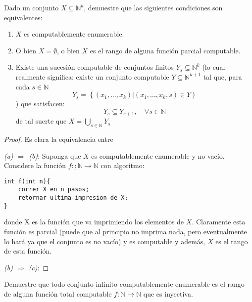 \documentclass[12pt]{report}
\newcounter{it}
\theoremstyle{largebreak}
\newcommand\cf[3]{\ensuremath{#1:#2\rightarrow#3}}
\begin{document}
    \begin{excer}
        Dado un conjunto $X\subseteq\mathbb{N}^k$, demuestre que las siguientes condiciones son equivalentes:
        \begin{enumerate}[label = \textit{(\alph*)}]
            \item $X$ es computablemente enumerable.
            \item O bien $X=\emptyset$, o bien $X$ es el rango de alguna función parcial computable.
            \item Existe una sucesión computable de conjuntos finitos $Y_s\subseteq\mathbb{N}^k$ (lo cual realmente significa: existe un conjunto computable $Y\subseteq\mathbb{N}^{ k+1}$ tal que, para cada $s\in\mathbb{N}$
            \begin{equation*}
                Y_s=\left\{(x_1,...,x_k)\Big|(x_1,...,x_k,s)\in Y \right\}
            \end{equation*}
            ) que satisfacen:
            \begin{equation*}
                Y_s\subseteq Y_{ s+1},\quad\forall s\in\mathbb{N}
            \end{equation*}
            de tal suerte que $X=\bigcup_{ s\in\mathbb{N}}Y_s$
        \end{enumerate}
    \end{excer}

    \begin{proof}
        Es clara la equivalencia entre 

        \textit{(a) $\Rightarrow$ (b)}: Suponga que $X$ es computablemente enumerable y no vacío. Considere la función $\cf{f}{;\mathbb{N}}{\mathbb{N}}$ con algoritmo:
        \begin{lstlisting}
int f(int n){
    correr X en n pasos;
    retornar ultima impresion de X;
}
        \end{lstlisting}
        donde {\selectfont X} es la función que va imprimiendo los elementos de $X$. Claramente esta función es parcial (puede que al principio no imprima nada, pero eventualmente lo hará ya que el conjunto es no vacío) y es computable y además, $X$ es el rango de esta función.

        \textit{(b) $\Rightarrow$ (c)}: 
    \end{proof}

    \begin{excer}
        Demuestre que todo conjunto infinito computablemente enumerable es el rango de alguna función total computable $\cf{f}{\mathbb{N}}{\mathbb{N}}$ que es inyectiva.
    \end{excer}
\end{document}
